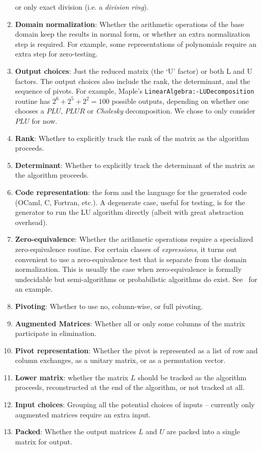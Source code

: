 \documentclass{elsart}
\begin{document}
\begin{enumerate}
        or only exact division (i.e. a \emph{division ring}).
    \item \textbf{Domain normalization}: Whether the arithmetic operations
        of the base domain keep the results in normal form, or whether
        an extra normalization step is required.  For example, some 
        representations of polynomials require an extra step for
        zero-testing.
    \item \textbf{Output choices}:  Just the reduced matrix
        (the `U' factor) or both L and U factors. The output
      choices also include
        the rank, the determinant, and the sequence of 
        pivots.  For example, Maple's
        \texttt{LinearAlgebra:\hyp LUDecomposition} routine has
        $2^6 + 2^5 + 2^2 = 100$ possible outputs, depending on whether
        one chooses a $PLU$, $PLUR$ or \emph{Cholesky} 
        decomposition.  We chose to only consider $PLU$ for now.
    \item \textbf{Rank}: Whether to explicitly track the rank of the matrix
        as the algorithm proceeds.
    \item \textbf{Determinant}:  Whether to explicitly track the determinant
        of the matrix as the algorithm proceeds.
    \item \textbf{Code representation}: the form and the language
      for the generated code (OCaml, C, Fortran, etc.). A
      degenerate case, useful for testing, is for the generator
      to run the LU algorithm directly (albeit with great
      abstraction overhead).
    \item \textbf{Zero-equivalence}: Whether the 
        arithmetic operations require a specialized zero-equivalence 
        routine.  For certain classes
        of \emph{expressions}, it turns out convenient to use 
        a zero-equivalence
        test that is separate from the domain normalization.  This is
        usually the case when zero-equivalence is formally undecidable
        but semi-algorithms or probabilistic algorithms do exist.
        See~\cite{ZhCaJeMo06a} for an example.
    \item \textbf{Pivoting}: Whether to use no, 
        column-wise, or full pivoting.
    \item \textbf{Augmented Matrices}: Whether all or only some
      columns of the matrix participate in elimination.
    \item \textbf{Pivot representation}: Whether the pivot is represented
      as a list of row and column exchanges, as a unitary matrix,
      or as a permutation vector.
  \item \textbf{Lower matrix}: whether the matrix $L$ should be tracked
      as the algorithm proceeds, reconstructed at the end of the
      algorithm, or not tracked at all.
  \item \textbf{Input choices}: Grouping all the potential
      choices of inputs -- currently only augmented matrices require
      an extra input.
  \item \textbf{Packed}: Whether the output matrices $L$ and $U$ are
      packed into a single matrix for output.
\setcounter{naspects}{\value{enumi}}
\end{enumerate}
\end{document}
